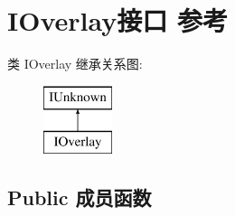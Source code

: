 \hypertarget{interface_i_overlay}{}\section{I\+Overlay接口 参考}
\label{interface_i_overlay}
类 I\+Overlay 继承关系图\+:\begin{figure}[H]
\begin{center}
\leavevmode
\includegraphics[height=2.000000cm]{interface_i_overlay}
\end{center}
\end{figure}
\subsection*{Public 成员函数}
